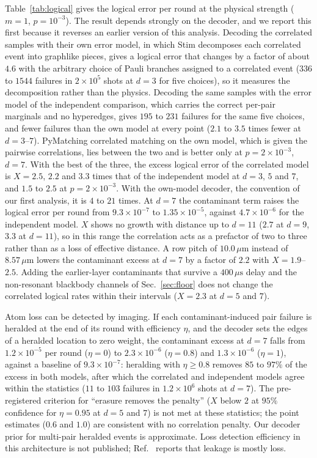 \documentclass[aps,pra,twocolumn,superscriptaddress,longbibliography,floatfix]{revtex4-2}
\newcommand{\um}{\,\mu\mathrm{m}}
\newcommand{\us}{\,\mu\mathrm{s}}
\begin{document}
Table~\ref{tab:logical} gives the logical error per round at the physical strength ($m=1$, $p=10^{-3}$). The result depends strongly on the decoder, and we report this first because it reverses an earlier version of this analysis. Decoding the correlated samples with their own error model, in which Stim decomposes each correlated event into graphlike pieces, gives a logical error that changes by a factor of about $4.6$ with the arbitrary choice of Pauli branches assigned to a correlated event ($336$ to $1544$ failures in $2\times10^{5}$ shots at $d=3$ for five choices), so it measures the decomposition rather than the physics. Decoding the same samples with the error model of the independent comparison, which carries the correct per-pair marginals and no hyperedges, gives $195$ to $231$ failures for the same five choices, and fewer failures than the own model at every point ($2.1$ to $3.5$ times fewer at $d=3$--$7$). PyMatching correlated matching on the own model, which is given the pairwise correlations, lies between the two and is better only at $p=2\times10^{-3}$, $d=7$. With the best of the three, the excess logical error of the correlated model is $X=2.5$, $2.2$ and $3.3$ times that of the independent model at $d=3$, $5$ and $7$, and $1.5$ to $2.5$ at $p=2\times10^{-3}$. With the own-model decoder, the convention of our first analysis, it is $4$ to $21$ times. At $d=7$ the contaminant term raises the logical error per round from $9.3\times10^{-7}$ to $1.35\times10^{-5}$, against $4.7\times10^{-6}$ for the independent model. $X$ shows no growth with distance up to $d=11$ ($2.7$ at $d=9$, $3.3$ at $d=11$), so in this range the correlation acts as a prefactor of two to three rather than as a loss of effective distance. A row pitch of $10.0\um$ instead of $8.57\um$ lowers the contaminant excess at $d=7$ by a factor of $2.2$ with $X=1.9$--$2.5$. Adding the earlier-layer contaminants that survive a $400\us$ delay and the non-resonant blackbody channels of Sec.~\ref{sec:floor} does not change the correlated logical rates within their intervals ($X=2.3$ at $d=5$ and $7$).

Atom loss can be detected by imaging. If each contaminant-induced pair failure is heralded at the end of its round with efficiency $\eta$, and the decoder sets the edges of a heralded location to zero weight, the contaminant excess at $d=7$ falls from $1.2\times10^{-5}$ per round ($\eta=0$) to $2.3\times10^{-6}$ ($\eta=0.8$) and $1.3\times10^{-6}$ ($\eta=1$), against a baseline of $9.3\times10^{-7}$: heralding with $\eta\ge0.8$ removes $85$ to $97\%$ of the excess in both models, after which the correlated and independent models agree within the statistics ($11$ to $103$ failures in $1.2\times10^{6}$ shots at $d=7$). The pre-registered criterion for ``erasure removes the penalty'' ($X$ below $2$ at $95\%$ confidence for $\eta=0.95$ at $d=5$ and $7$) is not met at these statistics; the point estimates ($0.6$ and $1.0$) are consistent with no correlation penalty. Our decoder prior for multi-pair heralded events is approximate. Loss detection efficiency in this architecture is not published; Ref.~\cite{Bluvstein2026} reports that leakage is mostly loss.
\end{document}
